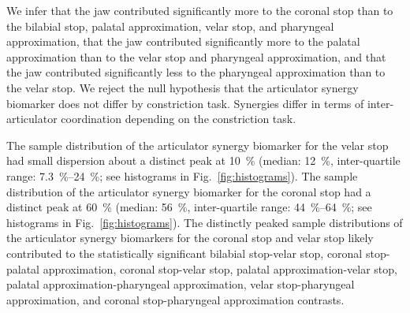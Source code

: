 \documentclass[preprint]{JASAnew}\usepackage[]{graphicx}\usepackage[]{color}
\begin{document}
We infer that the jaw contributed significantly more to the coronal stop than to the bilabial stop, palatal approximation, velar stop, and pharyngeal approximation,
%
that the jaw contributed significantly more to the palatal approximation than to the velar stop and pharyngeal approximation,
%
and that the jaw contributed significantly less to the pharyngeal approximation than to the velar stop.
%
We reject the null hypothesis that the articulator synergy biomarker does not differ by constriction task. 
%
Synergies differ in terms of inter-articulator coordination depending on the constriction task.




The sample distribution of the articulator synergy biomarker for the velar stop had small dispersion about a distinct peak at \SI{10}{\percent} 
%
(median: \SI{12}{\percent}, 
inter-quartile range: \SIrange{7.3}{24}{\percent}; see histograms in Fig.~\ref{fig:histograms}).
%
The sample distribution of the articulator synergy biomarker for the coronal stop had a distinct peak at \SI{60}{\percent}
%
(median: \SI{56}{\percent}, 
inter-quartile range: \SIrange{44}{64}{\percent}; see histograms in Fig.~\ref{fig:histograms}).
%
The distinctly peaked sample distributions of the articulator synergy biomarkers for the coronal stop and velar stop likely contributed to the statistically significant bilabial stop-velar stop, coronal stop-palatal approximation, coronal stop-velar stop, palatal approximation-velar stop, palatal approximation-pharyngeal approximation, velar stop-pharyngeal approximation, and coronal stop-pharyngeal approximation contrasts.
\end{document}
